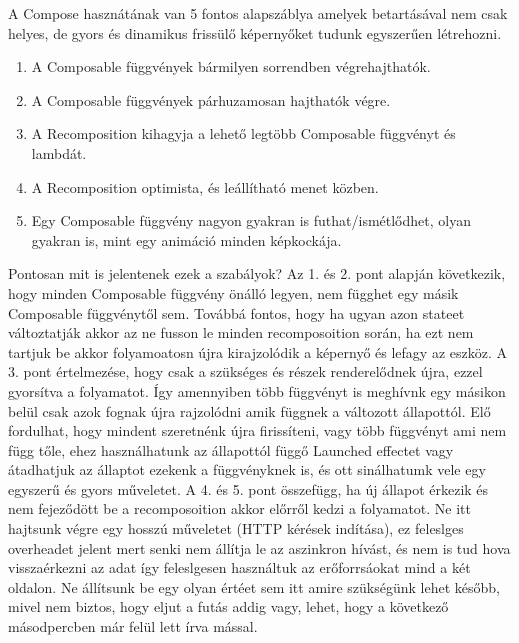 A Compose hasznátának van 5 fontos alapszáblya amelyek betartásával nem csak helyes, de gyors és dinamikus frissülő képernyőket tudunk egyszerűen létrehozni.
\begin{enumerate}
    \item A Composable függvények bármilyen sorrendben végrehajthatók.
    \item A Composable függvények párhuzamosan hajthatók végre.
    \item A Recomposition kihagyja a lehető legtöbb Composable függvényt és lambdát.
    \item A Recomposition optimista, és leállítható menet közben.
    \item Egy Composable függvény nagyon gyakran is futhat/ismétlődhet, olyan gyakran is, mint egy animáció minden képkockája.
\end{enumerate}

Pontosan mit is jelentenek ezek a szabályok?
Az 1. és 2. pont alapján következik, hogy minden Composable függvény önálló legyen, nem függhet egy másik Composable függvénytől sem.
Továbbá fontos, hogy ha ugyan azon stateet változtatják akkor az ne fusson le minden recomposoition során, ha ezt nem tartjuk be akkor folyamoatosn újra kirajzolódik a képernyő és lefagy az eszköz.
A 3. pont értelmezése, hogy csak a szükséges és részek renderelődnek újra, ezzel gyorsítva a folyamatot. Így amennyiben több függvényt is meghívnk egy másikon belül csak azok fognak újra rajzolódni amik függnek a változott állapottól.
Elő fordulhat, hogy mindent szeretnénk újra firissíteni, vagy több függvényt ami nem függ tőle, ehez használhatunk az állapottól függő Launched effectet vagy átadhatjuk az állaptot ezekenk a függvényknek is, és ott sinálhatumk vele egy egyszerű és gyors műveletet.
A 4. és 5. pont összefügg, ha új állapot érkezik és nem fejeződött be a recomposoition akkor előrről kedzi a folyamatot. Ne itt hajtsunk végre egy hosszú műveletet (HTTP kérések indítása), ez feleslges overheadet jelent mert senki nem állítja le az aszinkron hívást, és nem is tud hova visszaérkezni az adat így feleslgesen használtuk az erőforrsáokat mind a két oldalon.
Ne állítsunk be egy olyan értéet sem itt amire szükségünk lehet később, mivel nem biztos, hogy eljut a futás addig vagy, lehet, hogy a következő másodpercben már felül lett írva mással.

